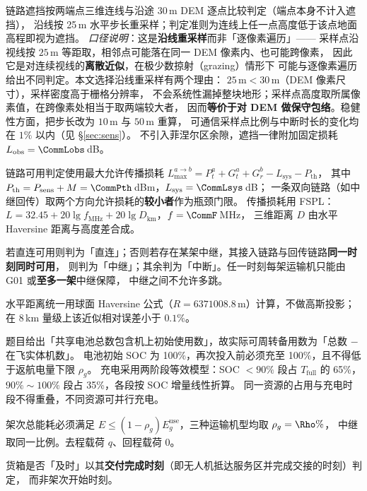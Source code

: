 \documentclass[12pt,a4paper,fontset=windows]{ctexart}
\begin{document}
\begin{description}[leftmargin=3.2em,itemsep=3pt,style=nextline]
链路遮挡按两端点三维连线与沿途 30\,m DEM 逐点比较判定（端点本身不计入遮挡），
沿线按 25\,m 水平步长重采样；判定准则为连线上任一点高度低于该点地面高程即视为遮挡。
\emph{口径说明}：这是\textbf{沿线重采样}而非「逐像素遍历」——
采样点沿视线按 $25$\,m 等距取，相邻点可能落在同一 DEM 像素内、也可能跨像素，
因此它是对连续视线的\textbf{离散近似}，在极少数掠射（grazing）情形下
可能与逐像素遍历给出不同判定。本文选择沿线重采样有两个理由：
$25\,\mathrm{m}<30\,\mathrm{m}$（DEM 像素尺寸），采样密度高于栅格分辨率，
不会系统性漏掉整块地形；采样点高度取所属像素值，在跨像素处相当于取两端较大者，
因而\textbf{等价于对 DEM 做保守包络}。稳健性方面，把步长改为 $10$\,m 与 $50$\,m 重算，
可通信采样点比例与中断时长的变化均在 $1\%$ 以内（见 \S\ref{sec:sens}）。
不引入菲涅尔区余隙，遮挡一律附加固定损耗 $L_{\mathrm{obs}}=\CommLobs$\,dB。
\item[\textbf{A6（链路门限双向取小）}]
链路可用判定使用最大允许传播损耗
$L_{\max}^{a\to b}=P_t^{a}+G_t^{a}+G_r^{b}-L_{\mathrm{sys}}-P_{\mathrm{th}}$，
其中 $P_{\mathrm{th}}=P_{\mathrm{sens}}+M=\CommPth$\,dBm，$L_{\mathrm{sys}}=\CommLsys$\,dB；
一条双向链路（如中继回传）取两个方向允许损耗的\textbf{较小者}作为瓶颈门限。
传播损耗用 FSPL：$L=32.45+20\lg f_{\mathrm{MHz}}+20\lg D_{\mathrm{km}}$，$f=\CommF$\,MHz，
三维距离 $D$ 由水平 Haversine 距离与高度差合成。
\item[\textbf{A7（通信状态判定的优先级）}]
若直连可用则判为「直连」；否则若存在某架中继，其接入链路与回传链路\textbf{同一时刻同时可用}，
则判为「中继」；其余判为「中断」。任一时刻每架运输机只能由 G01 或\textbf{至多一架}中继保障，
中继之间不允许多跳。
\item[\textbf{A8（平面距离近似）}]
水平距离统一用球面 Haversine 公式（$R=6371008.8$\,m）计算，不做高斯投影；
在 8\,km 量级上该近似相对误差小于 $0.1\%$。
\item[\textbf{A9（电池口径）}]
题目给出「共享电池总数包含机上初始使用数」，故实际可周转备用数为「总数 $-$ 在飞实体机数」。
电池初始 SOC 为 100\%，再次投入前必须充至 100\%，且不得低于返航电量下限 $\rho_g$。
充电采用两阶段等效模型：SOC $<90\%$ 段占 $T_{\mathrm{full}}$ 的 65\%，
$90\%\sim100\%$ 段占 35\%，各段按 SOC 增量线性折算。
同一资源的占用与充电时段不得重叠，不同资源可并行充电。
\item[\textbf{A10（返航安全余量）}]
架次总能耗必须满足 $E\le(1-\rho_g)E_g^{\mathrm{use}}$，三种运输机型均取 $\rho_g=\Rho\%$，
中继取同一比例。去程载荷 $q$、回程载荷 0。
\item[\textbf{A11（时效判定时刻）}]
货箱是否「及时」以其\textbf{交付完成时刻}（即无人机抵达服务区并完成交接的时刻）判定，
而非架次开始时刻。

\end{description}
\end{document}

